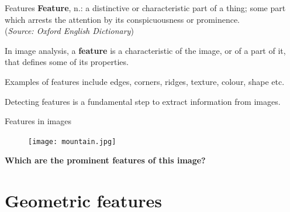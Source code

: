 \documentclass[9pt, aspectratio=169]{beamer}
\begin{document}
\begin{frame}
    {Features}
    \textbf{Feature}, n.: a distinctive or characteristic part of a thing; some part which arrests the attention by its conspicuousness or prominence.\\
    (\textit{Source: Oxford English Dictionary})
    \pause

    \vspace{2em}

    In image analysis, a \textbf{feature} is a characteristic of the image, or of a part of it, that defines some of its properties.

    Examples of features include edges, corners, ridges, texture, colour, shape etc.

    \pause
    \vspace{2em}
    Detecting features is a fundamental step to extract information from images.
\end{frame}

\begin{frame}
    {Features in images}
    \begin{figure}
        \texttt{[image: mountain.jpg]}
        \caption{\small{\color{gray}{View in the Gran Sasso mountain range, Italy - Photo: Nicola Roman\`o}\color{black}}}
    \end{figure}
    \centering
    \textbf{Which are the prominent features of this image?}
\end{frame}

\section{Geometric features}
\end{document}
